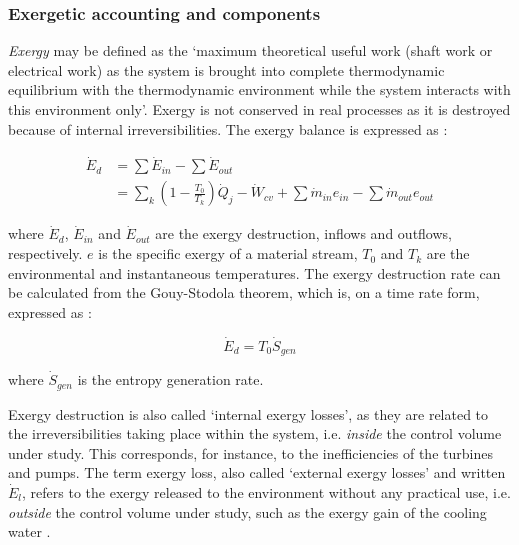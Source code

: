 \documentclass[final,times,5p]{elsarticle}
\begin{document}
	\subsubsection{Exergetic accounting and components}
	
	\emph{Exergy} may be defined as the `maximum theoretical useful work (shaft work or electrical work) as the system is brought into complete thermodynamic equilibrium with the thermodynamic environment while the system interacts with this environment only'. Exergy is not conserved in real processes as it is destroyed because of internal irreversibilities. The exergy balance is expressed as \cite{BejanAdrian;TsatsaronisGeorge;Moran1996}: 

	\begin{align}
		\dot{E}_d&=\sum \dot{E}_{in} - \sum \dot{E}_{out} \nonumber\\
					  &=\sum_k \left (1-\frac{T_0}{T_k} \right ) \dot{Q}_j-\dot{W}_{cv}+\sum \dot{m}_{in} e_{in} - \sum \dot{m}_{out} e_{out}
	\end{align}

	where $\dot{E}_d$, $\dot{E}_{in}$ and $\dot{E}_{out}$ are the exergy destruction, inflows and outflows, respectively. $e$ is the specific exergy of a material stream, $T_0$ and $T_k$ are the environmental and instantaneous temperatures. The exergy destruction rate can be calculated from the Gouy-Stodola theorem, which is, on a time rate form, expressed as \cite{Bejan2006}:

		
	\begin{equation}
		\dot{E}_d=T_0\dot{S}_{gen}
	\end{equation}
	
	where $\dot{S}_{gen}$ is the entropy generation rate.

	Exergy destruction is also called `internal exergy losses', as they are related to the irreversibilities taking place within the system, i.e. \emph{inside} the control volume under study. This corresponds, for instance, to the inefficiencies of the turbines and pumps. The term exergy loss, also called `external exergy losses' and written $\dot{E}_l$, refers to the exergy released to the environment without any practical use, i.e. \emph{outside} the control volume under study, such as the exergy gain of the cooling water \cite{Szargut1998,Kotas1995,BejanAdrian;TsatsaronisGeorge;Moran1996}. 
\end{document}
